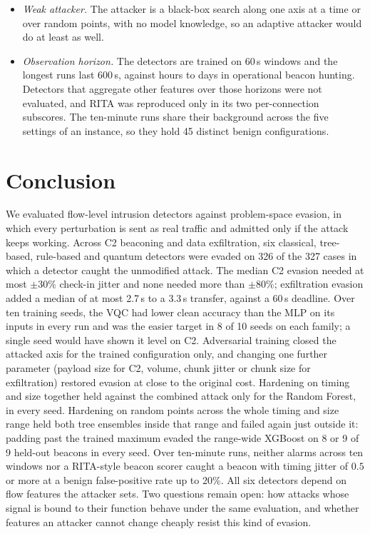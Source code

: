 \documentclass[preprint,12pt]{elsarticle}
\begin{document}
\begin{itemize}
        with one circuit design (8 qubits, 4 entangling layers); other encodings or hardware noise
        could behave differently.
  \item \emph{Weak attacker.} The attacker is a black-box search along one axis at a time or over
        random points, with no model knowledge, so an adaptive attacker would do at least as well.
  \item \emph{Observation horizon.} The detectors are trained on 60\,s windows and the longest runs
        last 600\,s, against hours to days in operational beacon hunting. Detectors that aggregate other
        features over those horizons were not evaluated, and RITA was reproduced only in its two
        per-connection subscores. The ten-minute runs share their background across the five settings
        of an instance, so they hold 45 distinct benign configurations.
\end{itemize}

\section{Conclusion}
\label{sec:conclusion}
We evaluated flow-level intrusion detectors against problem-space evasion, in which every perturbation
is sent as real traffic and admitted only if the attack keeps working. Across C2 beaconing and data
exfiltration, six classical, tree-based, rule-based and quantum detectors were evaded on 326 of the
327 cases in which a detector caught the unmodified attack. The median C2 evasion needed at most
$\pm30\%$ check-in jitter and none needed more than $\pm80\%$; exfiltration evasion added a median of at
most 2.7\,s to a 3.3\,s transfer, against a 60\,s deadline. Over ten training seeds, the VQC had lower clean
accuracy than the MLP on its inputs in every run and was the easier target in 8 of 10 seeds on each
family; a single seed would have shown it level on C2. Adversarial training closed the attacked axis for the trained configuration only, and
changing one further parameter (payload size for C2, volume, chunk jitter or chunk size for
exfiltration) restored evasion at close to the original cost. Hardening on timing and size together
held against the combined attack only for the Random Forest, in every seed. Hardening on random points
across the whole timing and size range held both tree ensembles inside that range and failed again
just outside it: padding past the trained maximum evaded the range-wide XGBoost on 8 or 9 of 9 held-out
beacons in every seed. Over ten-minute runs, neither alarms across ten windows nor a RITA-style
beacon scorer caught a beacon with timing jitter of $0.5$ or more at a benign false-positive rate up to
20\%. All six detectors depend on flow features
the attacker sets. Two questions remain open: how attacks whose signal is bound to their function
behave under the same evaluation, and whether features an attacker cannot change cheaply resist this
kind of evasion.
\end{document}
